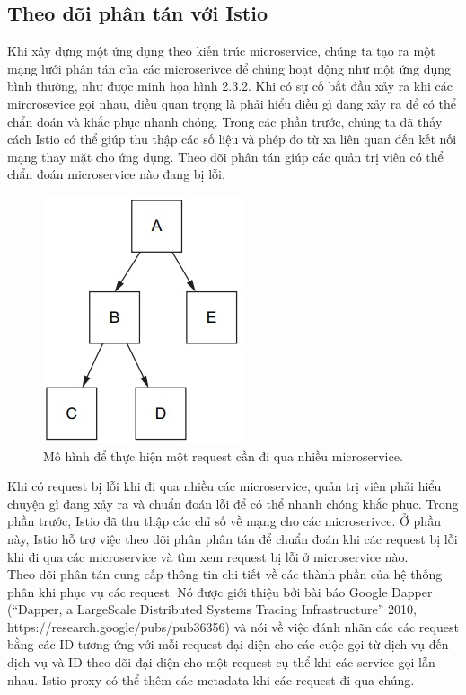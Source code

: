 \documentclass[12pt,a4paper]{report}
\begin{document}
{{\begin{figure}[h]
\end{figure}
	\subsection{Theo dõi phân tán với Istio}
		{\hspace{0.6cm}Khi xây dựng một ứng dụng theo kiến trúc microservice, chúng ta tạo ra một mạng lưới phân tán của các microserivce để chúng hoạt động như một ứng dụng bình thường, như được minh họa hình 2.3.2. Khi có sự cố bắt đầu xảy ra khi các mircrosevice gọi nhau, điều quan trọng là phải hiểu điều gì đang xảy ra để có thể chẩn đoán và khắc phục nhanh chóng. Trong các phần trước, chúng ta đã thấy cách Istio có thể giúp thu thập các số liệu và phép đo từ xa liên quan đến kết nối mạng thay mặt cho ứng dụng. Theo dõi phân tán giúp các quản trị viên có thể chẩn đoán microservice nào đang bị lỗi.}\\
			
		\begin{figure}[h]
			\centering
			\includegraphics[width=0.3\linewidth]{Pics/Untitled}
			\caption{Mô hình để thực hiện một request cần đi qua nhiều microservice.}
			\label{fig:untitled}
		\end{figure}
	
		Khi có request bị lỗi khi đi qua nhiều các microservice, quản trị viên phải hiểu chuyện gì đang xảy ra và chuẩn đoán lỗi để có thể nhanh chóng khắc phục. Trong phần trước, Istio đã thu thập các chỉ số về mạng cho các microserivce. Ở phần này, Istio hỗ trợ việc theo dõi phân phân tán để chuẩn đoán khi các request bị lỗi khi đi qua các microservice và tìm xem request bị lỗi ở microservice nào.\\
		
		Theo dõi phân tán cung cấp thông tin chi tiết về các thành phần của hệ thống phân khi phục vụ các request. Nó được giới thiệu bởi bài báo Google Dapper (“Dapper, a LargeScale Distributed Systems Tracing Infrastructure” 2010, https://research.google/pubs/pub36356) 
		và nói về việc đánh nhãn các các request bằng các ID tương ứng với mỗi request đại diện cho các cuộc gọi từ dịch vụ đến dịch vụ và ID theo dõi đại diện cho một request cụ thể khi các service gọi lẫn nhau. Istio proxy có thể thêm các metadata khi các request đi qua chúng.\\
		
}}
\end{document}
